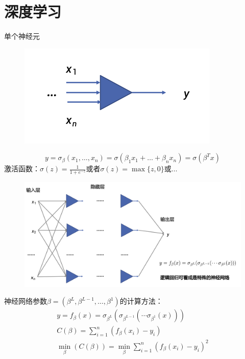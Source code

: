 \documentclass[11pt]{article}
\begin{document}
\section{深度学习}
\label{sec:orgd2d4274}
单个神经元
\begin{figure}[htbp]
\centering
\includegraphics[width=.5\textwidth]{../images/TrivialBigData/1.png}
\label{}
\end{figure}

\begin{equation*}
y=\sigma_\beta(x_1,\dots,x_n)=\sigma(\beta_1x_1+\dots+\beta_nx_n)=\sigma(\beta^Tx)
\end{equation*}
激活函数：\(\sigma(z)=\frac{1}{1+e^{-z}}\)或者\(\sigma(z)=\max\{z,0\}\)或\(\dots\)

\begin{figure}[htbp]
\centering
\includegraphics[width=.6\textwidth]{../images/TrivialBigData/2.png}
\label{}
\end{figure}

神经网络参数\(\beta=(\beta^L,\beta^{L-1},\dots,\beta^1)\)的计算方法：
\begin{gather*}
y=f_\beta(x)=\sigma_{\beta^L}(\sigma_{\beta^{L-1}}(\cdots\sigma_{\beta^1}(x)))\\
C(\beta)=\sum_{i=1}^n(f_\beta(x_i)-y_i)\\
\min_\beta(C(\beta))=\min_\beta\sum_{i=1}^n(f_\beta(x_i)-y_i)^2
\end{gather*}
\end{document}
